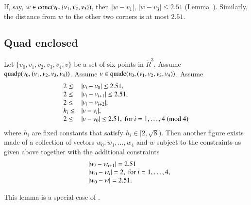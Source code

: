 \begin{tarskidata}
\begin{tarski}
\begin{proved}
If, say, $w\in {\operatorname{cone}}(v_0,\{v_1,v_2,v_3\})$, then
$|w-v_1|$, $|w-v_3|\le 2.51$ (Lemma~).
 Similarly, the distance from
$w$ to the other two corners is at most $2.51$.
\swallowed\end{proved}
\end{tarski}







\begin{tarski}
\section{Quad enclosed}

\begin{lemma}
Let $\{v_0,v_1,v_2,v_3,v_4,v\}$ be a set of six points in
$\ring{R}^3$.  Assume ${\operatorname{quadp}}(v_0,(v_1,v_2,v_3,v_4))$.
Assume $v\in {\operatorname{quadc}}(v_0,(v_1,v_2,v_3,v_4))$.
Assume 
    $$\begin{array}{lll}
    2\le &|v_i-v_0|\le 2.51,\\
    2\le&|v_i-v_{i+1}|\le 2.51, \\
    2\le&|v_i-v_{i+2}|,\\
    h_i\le &|v-v_i|, \\
    2\le &|v-v_0|\le 2.51, \hbox{ for }
        i=1,\ldots,4 \ (\hbox{mod } 4)\\
    \end{array}
    $$
where $h_i$ are fixed constants that satisfy
$h_i\in[2,\sqrt{8})$.  
Then another figure exists made of
a collection of vectors $w_0,w_1,\ldots,w_4$ and $w$ subject to
the constraints as given above together with the additional constraints
    $$\begin{array}{lll}
    &|w_i-w_{i+1}|=2.51\\
    &|w_0-w_i|=2, \hbox { for } i=1,\ldots,4,\\
    &|w_0-w|=2.51.
    \end{array}
    $$
\end{lemma}

\begin{proved} This  lemma is a special case of
\cite[Lemma~4.3]{part1}.
\swallowed\end{proved}
\end{tarski}






\end{tarskidata}

